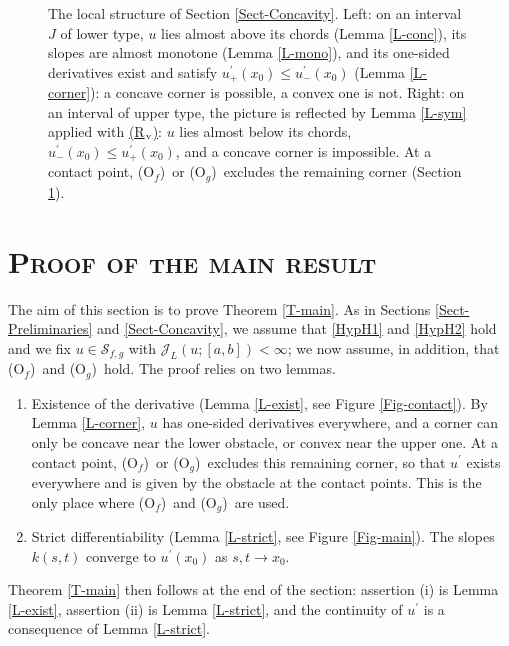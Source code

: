 \documentclass[reqno,12pt]{amsart}
\numberwithin{equation}{section}
\def\J{\mathcal{J}_L}
\def\Sol{\mathcal{S}_{f,g}}
\def\Of{{\sf (O$_f$)}}
\newcommand{\Rv}{\hyperref[HypS1]{{\sf (R$_{\rm v}$)}}}
\def\Og{{\sf (O$_g$)}}
\theoremstyle{remark}
\begin{document}
\begin{figure}[!htb]
\caption{The local structure of Section \ref{Sect-Concavity}. Left: on an interval $J$ of lower type, $u$ lies almost above its chords (Lemma \ref{L-conc}), its slopes are almost monotone (Lemma \ref{L-mono}), and its one-sided derivatives exist and satisfy $u^\prime_+(x_0)\leq u^\prime_-(x_0)$ (Lemma \ref{L-corner}): a concave corner is possible, a convex one is not. Right: on an interval of upper type, the picture is reflected by Lemma \ref{L-sym} applied with \Rv{}: $u$ lies almost below its chords, $u^\prime_-(x_0)\leq u^\prime_+(x_0)$, and a concave corner is impossible. At a contact point, \Of\ or \Og\ excludes the remaining corner (Section \ref{Sect-Proof-Main}).}\label{Fig-local}
\end{figure}

\FloatBarrier

\section{\textsc{\textsf{Proof of the main result}}}\label{Sect-Proof-Main}

The aim of this section is to prove Theorem \ref{T-main}. As in Sections \ref{Sect-Preliminaries} and \ref{Sect-Concavity}, we assume that \ref{HypH1} and \ref{HypH2} hold and we fix $u\in\Sol$ with $\J(u;[a,b])<\infty$; we now assume, in addition, that \Of\ and \Og\ hold. The proof relies on two lemmas.
\begin{enumerate}[leftmargin=3em, itemsep=0.4em, topsep=0.5em]
\item[$\scriptstyle\bullet$] {\sf Existence of the derivative} (Lemma \ref{L-exist}, see Figure \ref{Fig-contact}). By Lemma \ref{L-corner}, $u$ has one-sided derivatives everywhere, and a corner can only be concave near the lower obstacle, or convex near the upper one. At a contact point, \Of\ or \Og\ excludes this remaining corner, so that $u^\prime$ exists everywhere and is given by the obstacle at the contact points. This is the only place where \Of\ and \Og\ are used.
\item[$\scriptstyle\bullet$] {\sf Strict differentiability} (Lemma \ref{L-strict}, see Figure \ref{Fig-main}). The slopes $k(s,t)$ converge to $u^\prime(x_0)$ as $s,t\to x_0$.
\end{enumerate}
Theorem \ref{T-main} then follows at the end of the section: assertion (i) is Lemma \ref{L-exist}, assertion (ii) is Lemma \ref{L-strict}, and the continuity of $u^\prime$ is a consequence of Lemma \ref{L-strict}.
\end{document}
